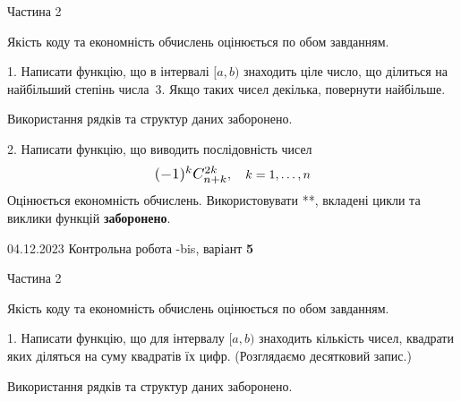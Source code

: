 \documentclass[12pt, ukrainian]{article}
\begin{document}
{{{\begin {Huge}
\begin{center}Частина 2
\end{center}
\vspace{10mm}
\end {Huge}

{
\begin {Large}
Якість коду та економність обчислень оцінюється по обом завданням. 

\vspace{5mm}

1. Написати функцію, що в інтервалі $[a, b)$ знаходить ціле число, що ділиться на найбільший степінь числа 3. Якщо таких чисел декілька, повернути найбільше.

 Використання рядків та структур даних заборонено. 



\vspace{10mm}



2. 
Написати функцію, що виводить послідовність чисел
$$\scalebox{1.2}{$(-1)^{k}C_{n+k}^{2k}$}, \quad k=1,\ldots,n$$
Оцінюється економність обчислень. Використовувати **, вкладені цикли та виклики функцій \textbf{заборонено}.

\end{Large}\newpage




\begin {Huge}
{{04.12.2023 Контрольна робота -bis, варіант  \No \textbf { 5 }\par}}

\begin{center}Частина 2
\end{center}
\vspace{10mm}
\end {Huge}

{
\begin {Large}
Якість коду та економність обчислень оцінюється по обом завданням. 

\vspace{5mm}

1. Написати функцію, що для інтервалу $[a, b)$ знаходить кількість чисел, квадрати яких діляться на суму квадратів їх цифр. (Розглядаємо десятковий запис.)

 Використання рядків та структур даних заборонено. 



\vspace{10mm}


\end{Large}}}}}}
\end{document}
